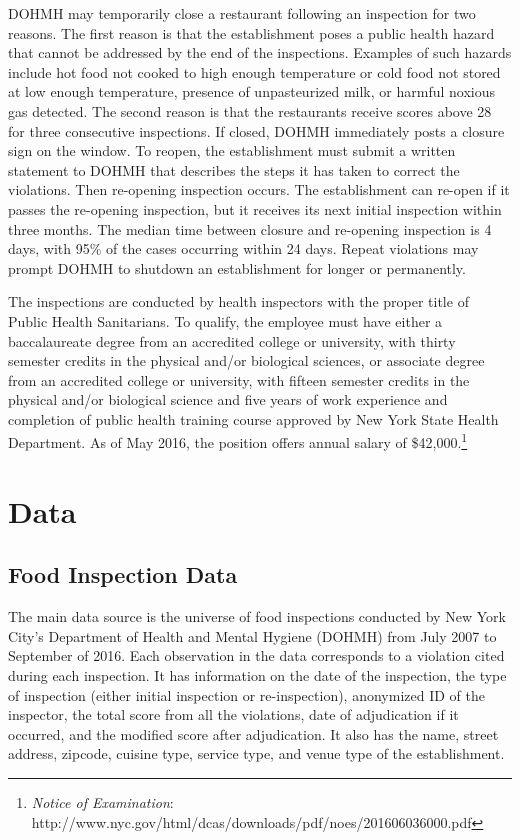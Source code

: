 \documentclass[12pt]{article}
\begin{document}
DOHMH may temporarily close a restaurant following an inspection for two reasons. The first reason is that the establishment poses a public health hazard that cannot be addressed by the end of the inspections. Examples of such hazards include hot food not cooked to high enough temperature or cold food not stored at low enough temperature, presence of unpasteurized milk, or harmful noxious gas detected. The second reason is that the restaurants receive scores above 28 for three consecutive inspections. If closed, DOHMH immediately posts a closure sign on the window. To reopen, the establishment must submit a written statement to DOHMH that describes the steps it has taken to correct the violations. Then re-opening inspection occurs. The establishment can re-open if it passes the re-opening inspection, but it receives its next initial inspection within three months. The median time between closure and re-opening inspection is 4 days, with 95\% of the cases occurring within 24 days. Repeat violations may prompt DOHMH to shutdown an establishment for longer or permanently. 

The inspections are conducted by health inspectors with the proper title of Public Health Sanitarians. To qualify, the employee must have either a baccalaureate degree from an accredited college or university, with thirty semester credits in the physical and/or biological sciences, or associate degree from an accredited college or university, with fifteen semester credits in the physical and/or biological science and five years of work experience and completion of public health training course approved by New York State Health Department. As of May 2016, the position offers annual salary of \$42,000.\footnote{\emph{Notice of Examination}: http://www.nyc.gov/html/dcas/downloads/pdf/noes/201606036000.pdf}

\section{Data}
\label{data}
\subsection{Food Inspection Data}

The main data source is the universe of food inspections conducted by New York City's Department of Health and Mental Hygiene (DOHMH) from July 2007 to September of 2016. Each observation in the data corresponds to a violation cited during each inspection. It has information on the date of the inspection, the type of inspection (either initial inspection or re-inspection), anonymized ID of the inspector, the total score from all the violations, date of adjudication if it occurred, and the modified score after adjudication. It also has the name, street address, zipcode, cuisine type, service type, and venue type of the establishment. 
\end{document}
